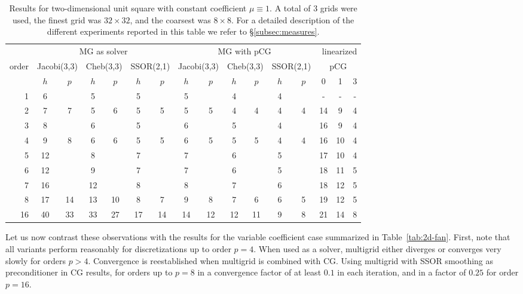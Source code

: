 \documentclass[smallcondensed,final]{svjour3}     %
\begin{document}
\begin{table}
  \caption{\label{tab:box} Results for two-dimensional unit square
    with constant coefficient $\mu\equiv 1$.  A total of 3 grids were
    used, the finest grid was $32\times 32$, and the coarsest was
    $8\times 8$. For a detailed description of the different
    experiments reported in this table we refer to
    \S\ref{subsec:measures}.}  \centering
  \begin{tabular}{|r|c c|c c|c c||c c|c c|c c||c c c|} 
    \hline
    & \multicolumn{6}{c||}{MG as solver} & \multicolumn{6}{c||}{MG with pCG} & \multicolumn{3}{r|}{linearized} \\
    \cline{2-13}
    \!\!\! order \!\!\!\! &  \multicolumn{2}{c|}{\!\!\scriptsize  Jacobi(3,3)\!\!} &  \multicolumn{2}{c|}{\!\!\scriptsize Cheb(3,3)\!\!} & \multicolumn{2}{c||}{\!\!\scriptsize  SSOR(2,1)\!\!} & \multicolumn{2}{c|}{\!\!\scriptsize Jacobi(3,3)\!\!} &  \multicolumn{2}{c|}{\!\!\scriptsize Cheb(3,3)\!\!} & \multicolumn{2}{c||}{\!\!\scriptsize SSOR(2,1)\!\!} & \multicolumn{3}{c|}{pCG}\\
\hline
 & $h$ & $p$ & $h$ & $p$& $h$ & $p$& $h$ & $p$& $h$ & $p$& $h$ & $p$& 0 & 1 & 3\\
 \cline{2-16}
1 & 6 & & 5 & & 5 & & 5 & & 4 & & 4 & & - & - & - \\
2 & 7 & 7 & 5 & 6 & 5 & 5 & 5 & 5 & 4 & 4 & 4 & 4 & 14 & 9 & 4 \\
3 & 8 & & 6 & & 5 & & 6 & & 5 & & 4 & & 16 & 9 & 4 \\
4 & 9 & 8 & 6 & 6 & 5 & 5 & 6 & 5 & 5 & 5 & 4 & 4 & 16 & 10 & 4 \\
5 & 12 & & 8 & & 7 & & 7 & & 6 & & 5 & & 17 & 10 & 4 \\
6 & 12 & & 9 & & 7 & & 7 & & 6 & & 5 & & 18 & 11 & 5\\
7 & 16 & & 12 & & 8 & & 8 & & 7 & & 6 & & 18 & 12 & 5 \\
8 & 17 & 14 & 13 & 10 & 8 & 7 & 9 & 8 & 7 & 6 & 6 & 5 & 19 & 12 & 5\\
16 & 40 & 33 & 33 & 27 & 17 & 14 & 14 & 12 & 12 & 11 & 9 & 8 & 21 & 14 & 8 \\
\hline
  \end{tabular}
\end{table}

Let us now contrast these observations with the results for the
variable coefficient case summarized in Table~\ref{tab:2d-fan}. First,
note that all variants perform reasonably for discretizations up to
order $p=4$. When used as a solver, multigrid either diverges or
converges very slowly for orders $p>4$. Convergence is reestablished
when multigrid is combined with CG. Using multigrid with SSOR
smoothing as preconditioner in CG results, for orders up to $p=8$ in a
convergence factor of at least $0.1$ in each iteration, and in a
factor of $0.25$ for order $p=16$.
\end{document}
